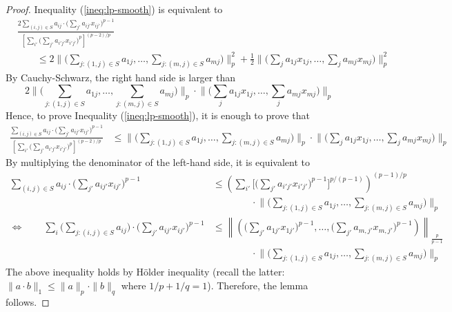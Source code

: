 \begin{proof}
Inequality (\ref{ineq:lp-smooth}) is equivalent to
\begin{align*}
&\frac{ 2\sum_{(i,j) \in S} a_{ij} \cdot \bigl( \sum_{j'} a_{ij'} x_{ij'} \bigr)^{p-1} }{ \left[ \sum_{i'} \bigl( \sum_{j'} a_{i'j'} x_{i'j'} \bigr)^{p} \right]^{(p-2)/p}} \\
& \qquad \leq 2 \biggl \| \biggl( \sum_{j: (1,j) \in S} a_{1j}, \ldots, \sum_{j: (m,j) \in S} a_{mj}  \biggr) \biggr\|_{p}^{2} 
		+ \frac{1}{2} \biggl \| \biggl( \sum_{j} a_{1j} x_{1j}, \ldots, \sum_{j} a_{mj} x_{mj} \biggr) \biggr\|_{p}^{2} 
\end{align*}
%
By Cauchy-Schwarz, the right hand side is larger than 
$$
2\biggl \| \biggl( \sum_{j: (1,j) \in S} a_{1j}, \ldots, \sum_{j: (m,j) \in S} a_{mj}  \biggr) \biggr\|_{p}
	\cdot \biggl \| \biggl( \sum_{j} a_{1j} x_{1j}, \ldots, \sum_{j} a_{mj} x_{mj} \biggr) \biggr\|_{p}
$$
Hence, to prove Inequality (\ref{ineq:lp-smooth}), it is enough to prove that
%
\begin{align*}
\frac{\sum_{(i,j) \in S} a_{ij} \cdot \bigl( \sum_{j'} a_{ij'} x_{ij'} \bigr)^{p-1} }{ \left[ \sum_{i'} \bigl( \sum_{j'} a_{i'j'} x_{i'j'} \bigr)^{p} \right]^{(p-2)/p}} 
&\leq \biggl \| \biggl( \sum_{j: (1,j) \in S} a_{1j}, \ldots, \sum_{j: (m,j) \in S} a_{mj}  \biggr) \biggr\|_{p}
	\cdot \biggl \| \biggl( \sum_{j} a_{1j} x_{1j}, \ldots, \sum_{j} a_{mj} x_{mj} \biggr) \biggr\|_{p} 
\end{align*}
%
By multiplying the denominator of the left-hand side, it is equivalent to
%
\begin{align*}
    \sum_{(i,j) \in S} a_{ij} \cdot \bigl( \sum_{j'} a_{ij'} x_{ij'} \bigr)^{p-1} &\leq
        \left ( \sum_{i'} \biggl [ \biggl( \sum_{j'} a_{i'j'} x_{i'j'} \biggr)^{p-1} \biggr]^{p/(p-1)} \right)^{(p-1)/p} \\
            & \qquad \qquad \cdot \biggl \| \biggl( \sum_{j: (1,j) \in S} a_{1j}, \ldots, \sum_{j: (m,j) \in S} a_{mj}  \biggr) \biggr\|_{p} \\
%
\Longleftrightarrow \qquad
    \sum_{i} \biggl ( \sum_{j: (i,j) \in S} a_{ij} \biggr) \cdot \biggl( \sum_{j'} a_{ij'} x_{ij'} \biggr)^{p-1} &\leq
        \left \| \left( \biggl( \sum_{j'} a_{1j'} x_{1j'} \biggr)^{p-1}, \ldots, \biggl( \sum_{j'} a_{m,j'} x_{m,j'} \biggr)^{p-1} \right)   \right \|_{\frac{p}{p-1}}  \\
            & \qquad \qquad \cdot \biggl \| \biggl( \sum_{j: (1,j) \in S} a_{1j}, \ldots, \sum_{j: (m,j) \in S} a_{mj}  \biggr) \biggr\|_{p}                        
\end{align*}
The above inequality holds by H\"older inequality (recall the latter: $\| a \cdot b\|_{1} \leq \| a \|_{p} \cdot \| b \|_{q}$ where $1/p + 1/q = 1$).
Therefore, the lemma follows.
\end{proof}


